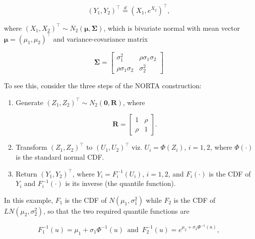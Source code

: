 \documentclass[
]{jss}
\begin{document}
\begin{equation}
\label{eq:kram1}
(Y_1, Y_2)^\top \stackrel{d}{=} \left(X_1, e^{X_2}\right)^\top,
\end{equation}

where \((X_1, X_2)^\top \sim N_2(\boldsymbol \mu, \boldsymbol \Sigma)\),
which is bivariate normal with mean vector
\(\boldsymbol \mu = (\mu_1, \mu_2)^\top\) and variance-covariance matrix

\begin{equation}
\label{eq:kram2}
\boldsymbol \Sigma = 
\begin{bmatrix}
\sigma_1^2 & \rho \sigma_1\sigma_2\\
\rho \sigma_1\sigma_2 & \sigma_2^2
\end{bmatrix}
\end{equation}

To see this, consider the three steps of the NORTA construction:

\begin{enumerate}

\item Generate $(Z_1, Z_2)^\top \sim N_2(\boldsymbol 0, \boldsymbol R)$, where 

\begin{equation}
\label{eq:kram3}
\boldsymbol R = 
\left[
\begin{array}{cc}
1 & \rho \\
\rho & 1
\end{array}
\right].
\end{equation}


\item Transform $(Z_1, Z_2)^\top$ to $(U_1, U_2)^\top$ viz. $U_i =\Phi(Z_i)$,  $i=1,2$, where $\Phi(\cdot)$ is the standard normal CDF. 

\item Return $(Y_1, Y_2)^\top$, where $Y_i=F_i^{-1}(U_i)$, $i=1,2$, and $F_i(\cdot)$ is the CDF of $Y_i$ and $F_i^{-1}(\cdot)$ is its inverse (the quantile function). 

\end{enumerate}

In this example, \(F_1\) is the CDF of \(N(\mu_1, \sigma_1^2)\) while
\(F_2\) is the CDF of \(LN(\mu_2, \sigma_2^2)\), so that the two
required quantile functions are

\begin{equation}
\label{eq:kram4}
F_1^{-1}(u) = \mu_1+\sigma_1 \Phi^{-1}(u)\,\,\, \mbox{and} \,\,\, F_2^{-1}(u) = e^{\mu_2+\sigma_2 \Phi^{-1}(u)}, 
\end{equation}
\end{document}
